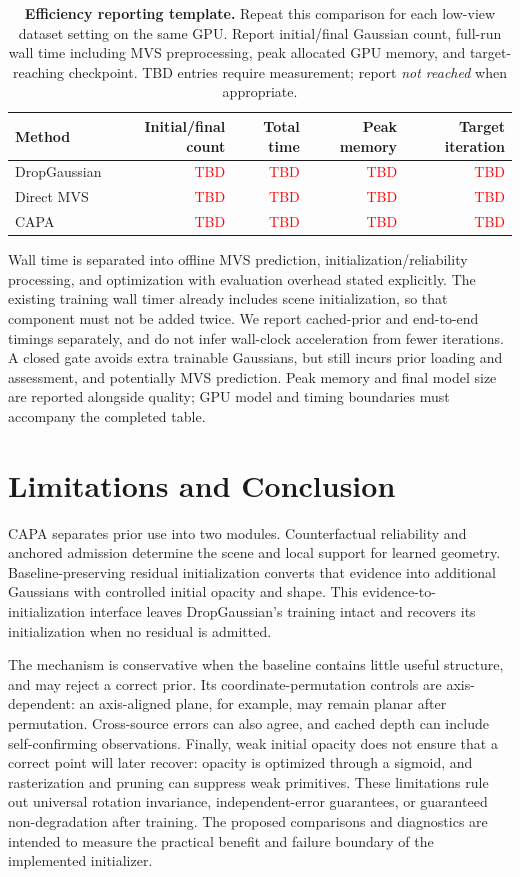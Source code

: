 \documentclass{article}
\newcommand{\ours}{CAPA}
\newcommand{\PH}[1]{\textcolor{red}{#1}}
\newcommand{\pending}{\PH{\textnormal{TBD}}}
\begin{document}
\begin{table}[t]
\caption{\textbf{Efficiency reporting template.} Repeat this comparison for each low-view dataset setting on the same GPU. Report initial/final Gaussian count, full-run wall time including MVS preprocessing, peak allocated GPU memory, and target-reaching checkpoint. TBD entries require measurement; report \emph{not reached} when appropriate.}
\label{tab:efficiency}
\centering\small
\setlength{\tabcolsep}{4pt}
\begin{tabular}{@{}lrrrr@{}}
\toprule
Method & Initial/final count & Total time & Peak memory & Target iteration\\
\midrule
DropGaussian & \pending & \pending & \pending & \pending\\
Direct MVS & \pending & \pending & \pending & \pending\\
\ours{} & \pending & \pending & \pending & \pending\\
\bottomrule
\end{tabular}
\end{table}

Wall time is separated into offline MVS prediction, initialization/reliability processing, and optimization with evaluation overhead stated explicitly. The existing training wall timer already includes scene initialization, so that component must not be added twice. We report cached-prior and end-to-end timings separately, and do not infer wall-clock acceleration from fewer iterations. A closed gate avoids extra trainable Gaussians, but still incurs prior loading and assessment, and potentially MVS prediction. Peak memory and final model size are reported alongside quality; GPU model and timing boundaries must accompany the completed table.

\section{Limitations and Conclusion}
\label{sec:conclusion}

\ours{} separates prior use into two modules. Counterfactual reliability and anchored admission determine the scene and local support for learned geometry. Baseline-preserving residual initialization converts that evidence into additional Gaussians with controlled initial opacity and shape. This evidence-to-initialization interface leaves DropGaussian's training intact and recovers its initialization when no residual is admitted.

The mechanism is conservative when the baseline contains little useful structure, and may reject a correct prior. Its coordinate-permutation controls are axis-dependent: an axis-aligned plane, for example, may remain planar after permutation. Cross-source errors can also agree, and cached depth can include self-confirming observations. Finally, weak initial opacity does not ensure that a correct point will later recover: opacity is optimized through a sigmoid, and rasterization and pruning can suppress weak primitives. These limitations rule out universal rotation invariance, independent-error guarantees, or guaranteed non-degradation after training. The proposed comparisons and diagnostics are intended to measure the practical benefit and failure boundary of the implemented initializer.
\end{document}
